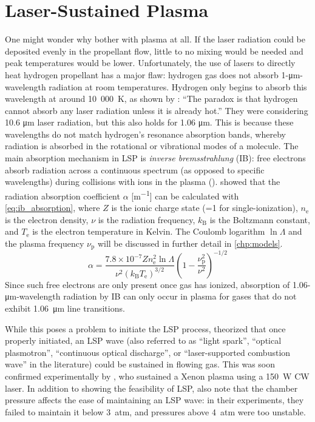    \section{Laser-Sustained Plasma} \label{sec:background_lsp}
        One might wonder why bother with plasma at all. If the laser radiation could be deposited evenly in the propellant flow, little to no mixing would be needed and peak temperatures would be lower. Unfortunately, the use of lasers to directly heat hydrogen propellant has a major flaw: hydrogen gas does not absorb 1-\unit{\um}-wavelength radiation at room temperatures. Hydrogen only begins to absorb this wavelength at around 10~000~K, as shown by \textcite{glumbConceptsStatusLasersupported1984}: ``The paradox is that hydrogen cannot absorb any laser radiation unless it is already hot.'' They were considering 10.6 \unit{\um} laser radiation, but this also holds for 1.06 \unit{\um}. This is because these wavelengths do not match hydrogen's resonance absorption bands, whereby radiation is absorbed in the rotational or vibrational modes of a molecule. The main absorption mechanism in LSP is \emph{inverse bremsstrahlung} (IB): free electrons absorb radiation across a continuous spectrum (as opposed to specific wavelengths) during collisions with ions in the plasma (\textcite{keeferLaserSustainedPlasmas1989}). \textcite{johnstonCorrectValuesHighfrequency1973} showed that the radiation absorption coefficient $\alpha$ [\unit{m^{-1}}] can be calculated with \autoref{eq:ib_absorption}, where $Z$ is the ionic charge state (=1 for single-ionization), $n_\mathrm{e}$ is the electron density, $\nu$ is the radiation frequency, $k_\mathrm{B}$ is the Boltzmann constant, and $T_\mathrm{e}$ is the electron temperature in Kelvin. The Coulomb logarithm $\ln{\Lambda}$ and the plasma frequency $\nu_\mathrm{p}$ will be discussed in further detail in \autoref{chp:models}.
        \newcommand{\ibalphaeq}{\alpha = \frac{7.8\times 10^{-7}Zn_\mathrm{e}^2\ln{\Lambda}}{\nu^2(k_\mathrm{B}T_\mathrm{e})^{3/2}} \left(1-\frac{\nu_\mathrm{p}^2}{\nu^2}\right)^{-1/2}}
        \begin{equation}
            \ibalphaeq \label{eq:ib_absorption}
        \end{equation}
        Since such free electrons are only present once gas has ionized, absorption of 1.06-\unit{\um}-wavelength radiation by IB can only occur in plasma for gases that do not exhibit \qty{1.06}{\um} line transitions.

        While this poses a problem to initiate the LSP process, \textcite{raizerSUBSONICPROPAGATIONLIGHT1970} theorized that once properly initiated, an LSP wave (also referred to as ``light spark'', ``optical plasmotron'', ``continuous optical discharge'', or ``laser-supported combustion wave'' in the literature) could be sustained in flowing gas. This was soon confirmed experimentally by \textcite{generalovContinuousOpticalDischarge1970}, who sustained a Xenon plasma using a 150~W CW  laser. In addition to showing the feasibility of LSP, \citeauthor{generalovContinuousOpticalDischarge1970} also note that the chamber pressure affects the ease of maintaining an LSP wave: in their experiments, they failed to maintain it below 3~\unit{atm}, and pressures above 4~\unit{atm} were too unstable.

